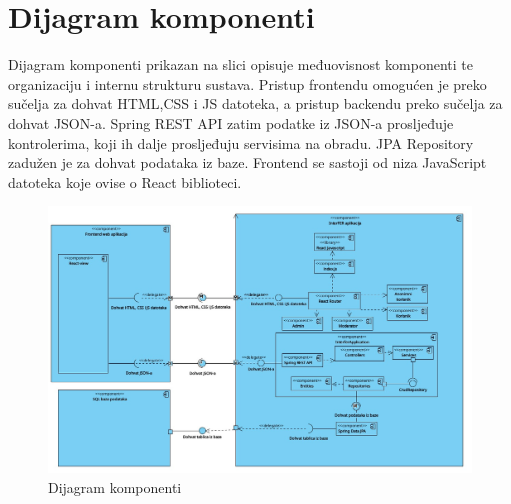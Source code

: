 \eject


\section{Dijagram komponenti}
Dijagram komponenti prikazan na slici opisuje međuovisnost komponenti te organizaciju i internu strukturu sustava. Pristup frontendu omogućen je preko sučelja za dohvat HTML,CSS i JS datoteka, a pristup backendu preko sučelja za dohvat JSON-a. Spring REST API zatim podatke iz JSON-a prosljeđuje kontrolerima, koji ih dalje prosljeđuju servisima na obradu. JPA Repository zadužen je za dohvat podataka iz baze. Frontend se sastoji od niza JavaScript datoteka koje ovise o React biblioteci.
\begin{figure}[H]
	\includegraphics[scale=0.4]{slike/dijagram_komponenti.jpeg}
	\centering
	\caption{Dijagram komponenti}
	\label{fig:component_diagram}
\end{figure}
